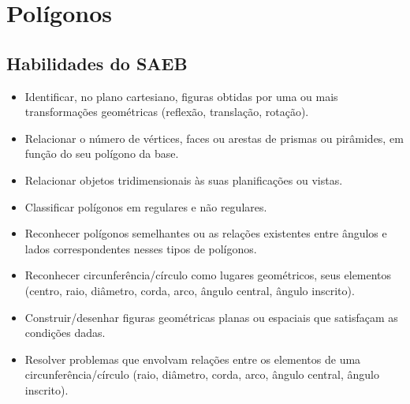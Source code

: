 

\chapter{Polígonos}

\section*{Habilidades do SAEB}
\begin{itemize}
\item Identificar, no plano cartesiano, figuras obtidas
por uma ou mais transformações geométricas (reflexão, translação,
rotação).
\item
  Relacionar o número de vértices, faces ou arestas de prismas ou
  pirâmides, em função do seu polígono da base.
\item
  Relacionar objetos tridimensionais às suas planificações ou vistas.
\item
  Classificar polígonos em regulares e não regulares.
\item
  Reconhecer polígonos semelhantes ou as relações existentes entre
  ângulos e lados correspondentes nesses tipos de polígonos.
\item
  Reconhecer circunferência/círculo como lugares geométricos, seus
  elementos (centro, raio, diâmetro, corda, arco, ângulo central, ângulo
  inscrito).
\item
  Construir/desenhar figuras geométricas planas ou espaciais que
  satisfaçam as condições dadas.
\item
  Resolver problemas que envolvam relações entre os elementos de uma
  circunferência/círculo (raio, diâmetro, corda, arco, ângulo central,
  ângulo inscrito).
\end{itemize}


